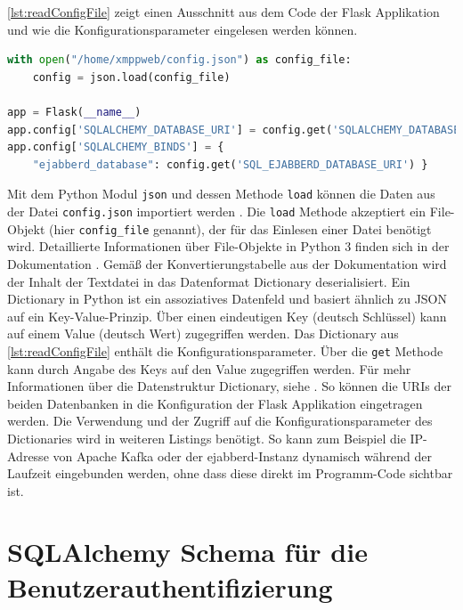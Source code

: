 \documentclass[a4paper,titlepage,halfparskip,12pt]{scrreprt}
\begin{document}
\begin{onehalfspacing}
\autoref{lst:readConfigFile} zeigt einen Ausschnitt aus dem Code der Flask Applikation und wie die Konfigurationsparameter eingelesen werden können.

\begin{lstlisting}[language=python, caption={Auslesen der Konfigurationsparameter aus einer Datei}, label={lst:readConfigFile}]
with open("/home/xmppweb/config.json") as config_file:
    config = json.load(config_file)

app = Flask(__name__)
app.config['SQLALCHEMY_DATABASE_URI'] = config.get('SQLALCHEMY_DATABASE_URI')
app.config['SQLALCHEMY_BINDS'] = {
    "ejabberd_database": config.get('SQL_EJABBERD_DATABASE_URI') }
\end{lstlisting}

Mit dem Python Modul \texttt{json} und dessen Methode \texttt{load} können die Daten aus der Datei \texttt{config.json} importiert werden \cite{pythonJSONapi}. Die \texttt{load} Methode akzeptiert ein File-Objekt (hier \texttt{config\_file} genannt), der für das Einlesen einer Datei benötigt wird. Detaillierte Informationen über File-Objekte in Python 3 finden sich in der Dokumentation \cite{usageFileDeskr}. Gemäß der Konvertierungstabelle aus der Dokumentation \cite{pythonJSONapi} wird der Inhalt der Textdatei in das Datenformat Dictionary deserialisiert. Ein Dictionary in Python ist ein assoziatives Datenfeld und basiert ähnlich zu \ac{JSON} auf ein Key-Value-Prinzip. Über einen eindeutigen Key (deutsch Schlüssel) kann auf einem Value (deutsch Wert) zugegriffen werden. Das Dictionary aus \autoref{lst:readConfigFile} enthält die Konfigurationsparameter. Über die \texttt{get} Methode kann durch Angabe des Keys auf den Value zugegriffen werden. Für mehr Informationen über die Datenstruktur Dictionary, siehe \cite{pythonDictionaries}. So können die \acs{URI}s der beiden Datenbanken in die Konfiguration der Flask Applikation eingetragen werden.  Die Verwendung und der Zugriff auf die Konfigurationsparameter des Dictionaries wird in weiteren Listings benötigt. So kann zum Beispiel die IP-Adresse von Apache Kafka oder der ejabberd-Instanz dynamisch während der Laufzeit eingebunden werden, ohne dass diese direkt im Programm-Code sichtbar ist.

\section{SQLAlchemy Schema für die Benutzerauthentifizierung}


\end{onehalfspacing}
\end{document}
